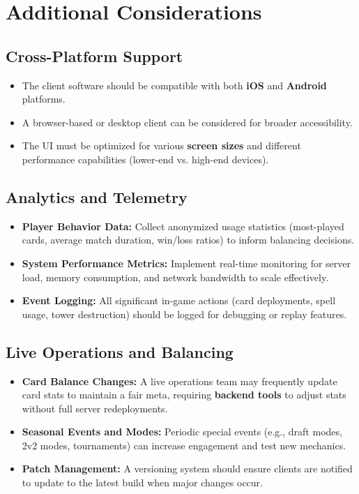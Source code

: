 \documentclass{article}
\begin{document}
\section{Additional Considerations}

\subsection{Cross-Platform Support}
\begin{itemize}
    \item The client software should be compatible with both \textbf{iOS} and \textbf{Android} platforms. 
    \item A browser-based or desktop client can be considered for broader accessibility.
    \item The UI must be optimized for various \textbf{screen sizes} and different performance capabilities (lower-end vs. high-end devices).
\end{itemize}

\subsection{Analytics and Telemetry}
\begin{itemize}
    \item \textbf{Player Behavior Data:} Collect anonymized usage statistics (most-played cards, average match duration, win/loss ratios) to inform balancing decisions.
    \item \textbf{System Performance Metrics:} Implement real-time monitoring for server load, memory consumption, and network bandwidth to scale effectively.
    \item \textbf{Event Logging:} All significant in-game actions (card deployments, spell usage, tower destruction) should be logged for debugging or replay features.
\end{itemize}

\subsection{Live Operations and Balancing}
\begin{itemize}
    \item \textbf{Card Balance Changes:} A live operations team may frequently update card stats to maintain a fair meta, requiring \textbf{backend tools} to adjust stats without full server redeployments.
    \item \textbf{Seasonal Events and Modes:} Periodic special events (e.g., draft modes, 2v2 modes, tournaments) can increase engagement and test new mechanics.
    \item \textbf{Patch Management:} A versioning system should ensure clients are notified to update to the latest build when major changes occur.
\end{itemize}
\end{document}
